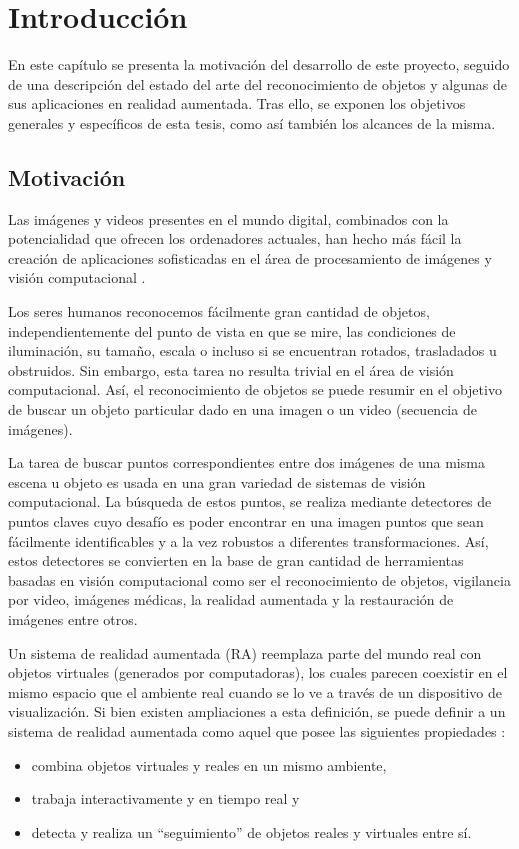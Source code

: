 \chapter{Introducción}
\label{c:introduccion}
\vspace{1cm}
En este capítulo se presenta la motivación del desarrollo de este proyecto, seguido de una descripción del estado del arte del reconocimiento de objetos y algunas de sus aplicaciones en realidad aumentada. Tras ello, se exponen los objetivos generales y específicos de esta tesis, como así también los alcances de la misma.
\section{Motivación}
Las imágenes y videos presentes en el mundo digital, combinados con la potencialidad que ofrecen los ordenadores 
actuales, han hecho más fácil la creación de aplicaciones sofisticadas en el área de procesamiento de imágenes y visión computacional \cite{citeulike:9456628}.

Los seres humanos reconocemos fácilmente gran cantidad de objetos, independientemente del punto de vista en que se mire, las condiciones de iluminación, su tamaño, escala o incluso si se encuentran rotados, trasladados u obstruidos. Sin embargo, esta tarea no resulta trivial en el área de visión computacional. Así, el reconocimiento de objetos se puede resumir en el objetivo de buscar un objeto particular dado en una imagen o un video (secuencia de imágenes). 

La tarea de buscar puntos correspondientes entre dos imágenes de una misma escena u objeto es usada en una gran variedad de sistemas de visión computacional. La búsqueda de estos puntos, se realiza mediante detectores de puntos claves cuyo desafío es poder encontrar en una imagen puntos que sean fácilmente identificables y a la vez robustos a diferentes transformaciones. Así, estos detectores se convierten en la base de gran cantidad de herramientas basadas en visión computacional como ser el reconocimiento de objetos, vigilancia por video, imágenes médicas, la realidad aumentada y la restauración de imágenes entre otros.

Un sistema de realidad aumentada (RA) reemplaza parte del mundo real con objetos virtuales (generados por computadoras), los cuales parecen coexistir en el mismo espacio que el ambiente real cuando se lo ve a través de un dispositivo de visualización.
Si bien existen ampliaciones a esta definición, se puede definir a un sistema de realidad aumentada como aquel que posee las siguientes propiedades \cite{Azuma:2001:RAA:616073.618862}:
\begin{itemize}
 \item combina objetos virtuales y reales en un mismo ambiente,
 \item trabaja interactivamente y en tiempo real y
 \item detecta y realiza un ``seguimiento'' de objetos reales y virtuales entre sí.
\end{itemize}

